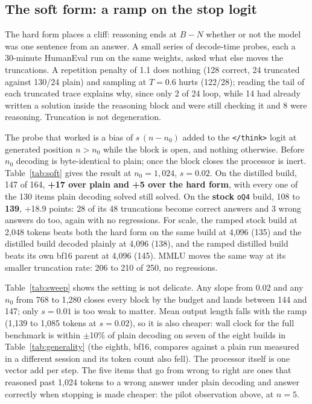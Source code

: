 \documentclass[11pt]{article}
\newcommand{\oQ}{\texttt{oQ4}}
\begin{document}
\subsection{The soft form: a ramp on the stop logit}
\label{sec:soft}

The hard form places a cliff: reasoning ends at $B-N$ whether or not the model
was one sentence from an answer.  A small series of decode-time probes, each a
30-minute HumanEval run on the same weights, asked what else moves the
truncations.  A repetition penalty of 1.1 does nothing (128 correct, 24
truncated against 130/24 plain) and sampling at $T=0.6$ hurts (122/28); reading
the tail of each truncated trace explains why, since only 2 of 24 loop, while
14 had already written a solution inside the reasoning block and were still
checking it and 8 were reasoning.  Truncation is not degeneration.

The probe that worked is a bias of $s\,(n-n_0)$ added to the \texttt{</think>}
logit at generated position $n>n_0$ while the block is open, and nothing
otherwise.  Before $n_0$ decoding is byte-identical to plain; once the block
closes the processor is inert.  Table~\ref{tab:soft} gives the result at
$n_0=1{,}024$, $s=0.02$.  On the distilled build, 147 of 164, \textbf{+17 over
plain and +5 over the hard form}, with every one of the 130 items plain
decoding solved still solved.  On the \textbf{stock} \oQ{} build, 108 to
\textbf{139}, +18.9 points: 28 of its 48 truncations become correct answers and
3 wrong answers do too, again with no regressions.  For scale, the ramped stock
build at 2{,}048 tokens beats both the hard form on the same build at 4{,}096
(135) and the distilled build decoded plainly at 4{,}096 (138), and the ramped
distilled build beats its own bf16 parent at 4{,}096 (145).  MMLU moves the
same way at its smaller truncation rate: 206 to 210 of 250, no regressions.




Table~\ref{tab:sweep} shows the setting is not delicate.  Any slope from 0.02
and any $n_0$ from 768 to 1{,}280 closes every block by the budget and lands
between 144 and 147; only $s=0.01$ is too weak to matter.  Mean output length
falls with the ramp (1{,}139 to 1{,}085 tokens at $s=0.02$), so it is also
cheaper: wall clock for the full benchmark is within $\pm$10\% of plain
decoding on seven of the eight builds in Table~\ref{tab:generality} (the
eighth, bf16, compares against a plain run measured in a different session
and its token count also fell).  The processor itself is one vector add per
step.  The five items that go from wrong to right are ones that reasoned
past 1{,}024 tokens to a wrong answer under plain decoding and answer
correctly when stopping is made cheaper: the pilot observation above, at
$n=5$.
\end{document}
